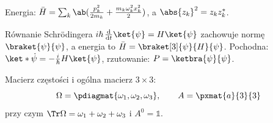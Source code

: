 \documentclass[a4paper, polish, 11pt]{scrartcl}
\begin{document}
Energia: $\bar H = \sum_{k} \ab(\frac{p_k^2}{2m_k} + \frac{m_k\omega_k^2 x_k^2}{2})$, a $\abs{z_k}^2 = z_k z_k^*$.

Równanie Schrödingera $i\hbar\,\odv{}{t}\ket{\psi} = H\ket{\psi}$ zachowuje normę $\braket{\psi}{\psi}$, a energia to $\bar H = \braket[3]{\psi}{H}{\psi}$. Pochodna: $\ket*{\dot\psi} = -\frac{i}{\hbar}H\ket{\psi}$, rzutowanie: $P = \ketbra{\psi}{\psi}$.

Macierz częstości i ogólna macierz $3 \times 3$:
\begin{equation}
	\setlength{\arraycolsep}{2pt}
	\Omega = \pdiagmat{\omega_1, \omega_2, \omega_3}, \qquad A = \pxmat{a}{3}{3}
	\label{eq:macierz}
\end{equation}
przy czym $\Tr\Omega = \omega_1 + \omega_2 + \omega_3$ i $A^0 = \mathds{1}$.
\end{document}
